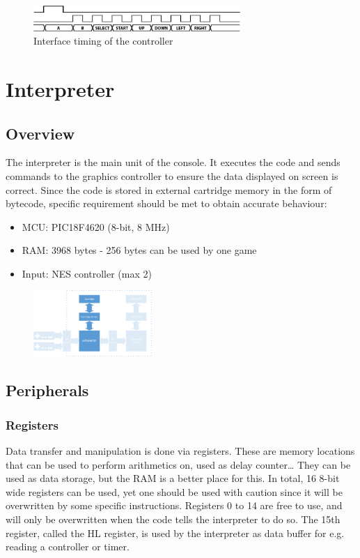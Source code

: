 		\begin{figure}[H]
			\centering
			\includegraphics[width=0.7\textwidth]{GameController/ControllerInterface.PNG}
			\caption{Interface timing of the controller}\par
			\label{fig:ControllerInterface}
		\end{figure}

\section{Interpreter}
	\subsection{Overview}
		\par The interpreter is the main unit of the console. It executes the code and sends commands to the graphics controller to ensure the data displayed on screen is correct.
		Since the code is stored in external cartridge memory in the form of bytecode, specific requirement should be met to obtain accurate behaviour:
		\begin{itemize}
			\item MCU: PIC18F4620 (8-bit, 8 MHz)
			\item RAM: 3968 bytes - 256 bytes can be used by one game
			\item Input: NES controller (max 2)
		\end{itemize}

		\begin{figure}[H]
			\centering
			\includegraphics[width=0.4\textwidth]{GameConsole/Interpreter_overview.PNG}
			\label{fig:InterpreterOverview}
		\end{figure}

	\subsection{Peripherals}
		\subsubsection{Registers}
			\par Data transfer and manipulation is done via registers.
			These are memory locations that can be used to perform arithmetics on, used as delay counter\ldots
			They can be used as data storage, but the RAM is a better place for this.
			In total, 16 8-bit wide registers can be used, yet one should be used with caution since it will be overwritten by some specific instructions.
			Registers 0 to 14 are free to use, and will only be overwritten when the code tells the interpreter to do so.
			The 15th register, called the HL register, is used by the interpreter as data buffer for e.g. reading a controller or timer.

